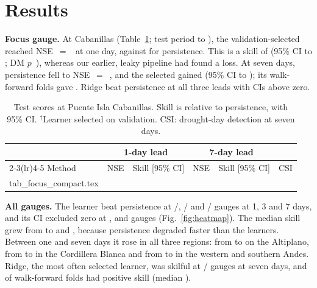 \documentclass[graybox]{svmult}
\makeatletter
\newcommand{\inputtable}[1]{\@@input #1 }
\makeatother
\begin{document}
\section{Results}
\label{sec:results}

\textbf{Focus gauge.} At Cabanillas (Table~\ref{tab:focus}; test period \focusTestStart{} to \focusTestEnd{}), the validation-selected \focusBestOne{} reached NSE~$=$~\focusBestNseOne{} at one day, against \focusPersNseOne{} for persistence. This is a skill of \focusBestSkillOne{} (95\% CI \focusBestLoOne{} to \focusBestHiOne{}; DM $p$~\focusBestDmpOne{}), whereas our earlier, leaky pipeline had found a loss. At seven days, persistence fell to NSE~$=$~\focusPersNseSeven{}, and the selected \focusBestSeven{} gained \focusBestSkillSeven{} (95\% CI \focusBestLoSeven{} to \focusBestHiSeven{}); its walk-forward folds gave \wfFocusSkills{}. Ridge beat persistence at all three leads with CIs above zero.

\begin{table}[tb]
\centering
\caption{Test scores at Puente Isla Cabanillas. Skill is relative to persistence, with 95\% CI. $^\dagger$Learner selected on validation. CSI: drought-day detection at seven days.}
\label{tab:focus}
\scriptsize
\setlength{\tabcolsep}{3pt}
\begin{tabular}{lrcrcr}
\toprule
& \multicolumn{2}{c}{1-day lead} & \multicolumn{2}{c}{7-day lead} & \\
\cmidrule(lr){2-3}\cmidrule(lr){4-5}
Method & NSE & Skill [95\% CI] & NSE & Skill [95\% CI] & CSI \\
\midrule
\inputtable{tab_focus_compact.tex}
\bottomrule
\end{tabular}
\end{table}

\textbf{All gauges.} The learner beat persistence at \nPosOne{}/\nGauges{}, \nPosThree{}/\nGauges{} and \nPosSeven{}/\nGauges{} gauges at 1, 3 and 7 days, and its CI excluded zero at \nSigOne{}, \nSigThree{} and \nSigSeven{} gauges (Fig.~\ref{fig:heatmap}). The median skill grew from \medSkillOne{} to \medSkillThree{} and \medSkillSeven{}, because persistence degraded faster than the learners. Between one and seven days it rose in all three regions: from \medSkillAltiOne{} to \medSkillAltiSeven{} on the Altiplano, from \medSkillCBOne{} to \medSkillCBSeven{} in the Cordillera Blanca and from \medSkillWSAOne{} to \medSkillWSASeven{} in the western and southern Andes. Ridge, the most often selected learner, was skilful at \nRidgePosSeven{}/\nGauges{} gauges at seven days, and \wfNPos{} of \wfNFolds{} walk-forward folds had positive skill (median \wfMedSkill{}).
\end{document}
